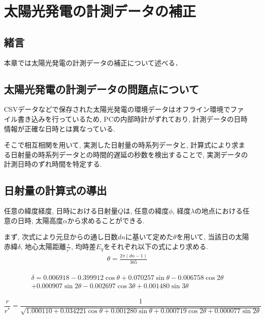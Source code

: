 
\chapter{太陽光発電の計測データの補正}
\label{chap:second}

\section{緒言}
本章では太陽光発電の計測データの補正について述べる．


\section{太陽光発電の計測データの問題点について}
CSVデータなどで保存された太陽光発電の環境データはオフライン環境でファイル書き込みを行っているため, PCの内部時計がずれており, 計測データの日時情報が正確な日時とは異なっている.

そこで相互相関を用いて, 実測した日射量の時系列データと, 計算式により求まる日射量の時系列データとの時間的遅延の秒数を検出することで, 実測データの計測日時のずれ時間を特定する.

\section{日射量の計算式の導出}
任意の緯度経度, 日時における日射量$Q$は, 任意の緯度$\phi$, 経度$\lambda$の地点における任意の日時, 太陽高度$\alpha$から求めることができる.

まず, 次式により元旦からの通し日数$dn$に基いて定めた$\theta$を用いて, 当該日の太陽赤緯$\delta$, 地心太陽距離$\frac{r}{r^{*}}$, 均時差$E_q$をそれぞれ以下の式により求める.
\begin{eqnarray}
  \theta =  \frac{2\pi (dn-1)}{365}
\end{eqnarray}

\begin{eqnarray}
  \begin{split}
    \delta =  0.006918-0.399912\cos \theta+0.070257\sin \theta-0.006758\cos 2\theta\\
    +0.000907\sin 2\theta-0.002697\cos 3\theta+0.001480\sin 3\theta
  \end{split}
\end{eqnarray}

\begin{dmath}
  \frac{r}{r^{*}} =  \frac{1}{\sqrt{1.000110+0.034221\cos \theta+0.001280\sin \theta+0.000719\cos 2\theta+0.000077\sin 2\theta}}
\end{dmath}

